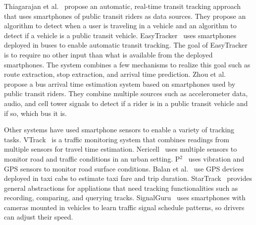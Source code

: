 Thiagarajan et al.~\cite{Thiagarajan:2010:CTT} propose an automatic, real-time
transit tracking approach that uses smartphones of public transit riders as data
sources. They propose an algorithm to detect when a user is traveling in a
vehicle and an algorithm to detect if a vehicle is a public transit vehicle.
EasyTracker~\cite{Biagioni:2011:EAT} uses smartphones deployed in buses to
enable automatic transit tracking. The goal of EasyTracker is to require no
other input than what is available from the deployed smartphones. The system
combines a few mechanisms to realize this goal such as route extraction, stop
extraction, and arrival time prediction. Zhou et al.~\cite{Zhou:2012:LWP}
propose a bus arrival time estimation system based on smartphones used by public
transit riders. They combine multiple sources such as accelerometer data, audio,
and cell tower signals to detect if a rider is in a public transit vehicle and
if so, which bus it is.

Other systems have used smartphone sensors to enable a variety of tracking
tasks. VTrack~\cite{Thiagarajan:2009:VAE} is a traffic monitoring system that
combines readings from multiple sensors for travel time estimation.
Nericell~\cite{Mohan:2008:NRM} uses multiple sensors to monitor road and traffic
conditions in an urban setting. P$^{2}$~\cite{Eriksson:2008:PPU} uses vibration
and GPS sensors to monitor road surface conditions. Balan et
al.~\cite{Balan:2011:RTI} use GPS devices deployed in taxi cabs to estimate
taxi fare and trip duration. StarTrack~\cite{Ananthanarayanan:2009:SFE,
Haridasan:2010:SNG} provides general abstractions for appliations that need
tracking functionalities such as recording, comparing, and querying tracks.
SignalGuru~\cite{Koukoumidis:2011:SLM} uses smartphones with cameras mounted in
vehicles to learn traffic signal schedule patterns, so drivers can adjust their
speed.
